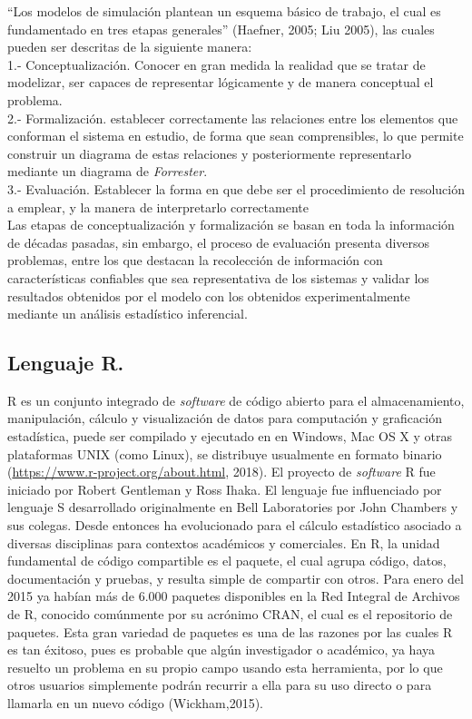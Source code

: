 ``Los modelos de simulaci\'on plantean un esquema b\'asico de trabajo, el cual es fundamentado en tres etapas generales'' (Haefner, 2005; Liu 2005), las cuales pueden ser descritas de la siguiente manera:\\

1.- Conceptualizaci\'on. Conocer en gran medida la realidad que se tratar de modelizar, ser capaces de representar l\'ogicamente y de manera conceptual el problema. \\

2.- Formalizaci\'on. establecer correctamente las relaciones entre los elementos que conforman el sistema en estudio, de forma que sean comprensibles, lo que permite construir un diagrama de estas relaciones y posteriormente representarlo mediante un diagrama de \textit{Forrester}.\\

3.- Evaluaci\'on. Establecer la forma en que debe ser el procedimiento de resoluci\'on a emplear, y la manera de interpretarlo correctamente \\


Las etapas de conceptualizaci\'on y formalizaci\'on se basan en toda la informaci\'on de d\'ecadas pasadas, sin embargo, el proceso de evaluaci\'on presenta diversos problemas, entre los que destacan la recolecci\'on de informaci\'on con caracter\'isticas confiables que sea representativa de los sistemas y validar los resultados obtenidos por el modelo con los obtenidos experimentalmente mediante un an\'alisis estad\'istico inferencial.


\subsection{Lenguaje R.}

R es un conjunto  integrado de \textit{software} de c\'odigo abierto para el almacenamiento, manipulaci\'on, c\'alculo y visualizaci\'on de datos para computaci\'on y graficaci\'on estad\'istica, puede ser compilado y ejecutado en  en Windows, Mac OS X y otras  plataformas UNIX (como Linux), se distribuye usualmente en formato binario (\url{https://www.r-project.org/about.html}, 2018). El proyecto de \emph{software} R fue iniciado por Robert Gentleman y Ross Ihaka. El lenguaje fue influenciado por  lenguaje S desarrollado originalmente en Bell Laboratories por John Chambers y sus colegas. Desde entonces ha evolucionado  para el c\'alculo estad\'istico asociado a diversas disciplinas para contextos acad\'emicos y comerciales. En R, la unidad fundamental de c\'odigo compartible es el paquete, el cual agrupa c\'odigo, datos, documentaci\'on y pruebas, y resulta simple de compartir con otros. Para enero del 2015 ya hab\'ian m\'as de 6.000 paquetes disponibles en la Red Integral de Archivos de R, conocido com\'unmente por su acr\'onimo CRAN, el cual es el repositorio de paquetes. Esta gran variedad de paquetes es una de las razones por las cuales R es tan \'exitoso, pues es probable que alg\'un investigador o acad\'emico, ya haya resuelto un problema en su propio campo usando esta herramienta, por lo que otros usuarios simplemente podr\'an recurrir a ella para su uso directo o para llamarla en un nuevo c\'odigo (Wickham,2015). \\


